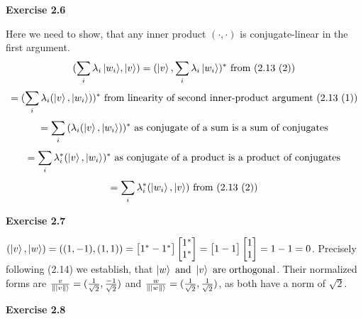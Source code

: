 \documentclass{article}
\begin{document}
\bigskip

\begin{framed}
    \noindent \textbf{Exercise 2.6}
    
    \medskip
    
    Here we need to show, that any inner product $(\cdot, \cdot)$ is conjugate-linear in the first argument.
    $$
    (\sum_{i}{\lambda_i \ket{w_i}}, \ket{v}) = (\ket{v}, \sum_{i}{\lambda_i \ket{w_i}})^{*} \text{ from (2.13 (2))}
    $$
    $$
    = (\sum_{i}{\lambda_i(\ket{v}, \ket{w_i})})^{*} \text{ from linearity of second inner-product argument (2.13 (1))}
    $$
    $$
    = \sum_{i}{(\lambda_i(\ket{v}, \ket{w_i}))^*} \text{ as conjugate of a sum is a sum of conjugates}
    $$
    $$
    = \sum_{i}{\lambda_i^*(\ket{v}, \ket{w_i})^*}  \text{ as conjugate of a product is a product of conjugates}
    $$
    $$
    = \sum_{i}{\lambda_i^*(\ket{w_i}, \ket{v})} \text{ from (2.13 (2))}
    $$
    
\end{framed}

\bigskip

\begin{framed}
    \noindent \textbf{Exercise 2.7}
    
    \medskip
    
    $(\ket{v}, \ket{w}) =  ((1, -1), (1, 1)) = \begin{bmatrix} 1^* -1^* \end{bmatrix} \begin{bmatrix} 1^* \\ 1^* \end{bmatrix} = \begin{bmatrix} 1 -1 \end{bmatrix} \begin{bmatrix} 1 \\ 1 \end{bmatrix} = 1 - 1 = 0$. Precisely following (2.14) we establish, that $\ket{w} \text{ and } \ket{v} \text{ are orthogonal}$. Their normalized forms are $\frac{v}{\| \ket{v \|}} = (\frac{1}{\sqrt{2}}, \frac{-1}{\sqrt{2}})$ and $\frac{w}{\| \ket{w \|}} = (\frac{1}{\sqrt{2}}, \frac{1}{\sqrt{2}})$, as both have a norm of $\sqrt{2}$.
    
\end{framed}

\bigskip

\begin{framed}
    \noindent \textbf{Exercise 2.8}
    
    \medskip
    
    
\end{framed}
\end{document}
